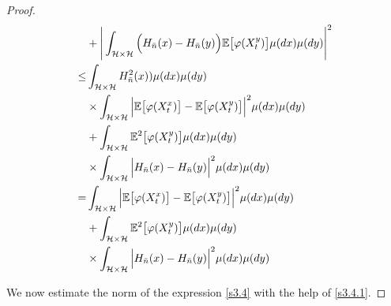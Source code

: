 \documentclass[review, onefignum, onetabnum]{siamart171218}
\begin{document}
\begin{proof}
\begin{equation}
\begin{aligned}
            &+
            \Bigg|
                \int_{\mathcal{H}
                \times
                \mathcal{H}
                }
                \Big(
                    H_{\bar n}(x) - H_{\bar n}(y)
                \Big)
                \mathbb{E}\big[
                    \varphi(X_t ^ y)
                \big]
                \mu(dx)\mu(dy)
            \Bigg|^2
            \\
            \le &
            \int_{\mathcal{H}\times \mathcal{H}}
                H_{\bar n}^2(x))
            \mu(dx)\mu(dy)
            \\
            &\times
                \int_{\mathcal{H}\times \mathcal{H}}
                \Big|
                    \mathbb{E}\big [
                        \varphi(X_t^x)
                    \big]
                    -
                    \mathbb{E}\big[
                        \varphi(X_t^y)
                    \big]
                \Big|^2
                \mu(dx)\mu(dy)
            \\
            &+
            \int_{\mathcal{H} \times \mathcal{H}}
                \mathbb{E}^2\big[
                    \varphi(X_t^y)
                \big]
            \mu(dx)\mu(dy)
            \\
             &\times
            \int_{\mathcal{H}\times \mathcal{H}}
            \Big|
                H_{\bar n}(x)-H_{\bar n}(y)
            \Big|^2
            \mu(dx)\mu(dy)
            \\
            =&
            \int_{\mathcal{H}\times \mathcal{H}}
                \Big|
                    \mathbb{E}\big [
                        \varphi(X_t^x)
                    \big]
                    -
                    \mathbb{E}\big[
                        \varphi(X_t^y)
                    \big]
                \Big|^2
                \mu(dx) \mu(dy)
            \\
            &+
            \int_{\mathcal{H}\times \mathcal{H}}
                \mathbb{E}^2\big[
                    \varphi(X_t^y)
                \big]
            \mu(dx)\mu(dy)
            \\
            & \times
            \int_{\mathcal{H}\times \mathcal{H}}
                \Big|
                    H_{\bar n}(x)
                    -
                    H_{\bar n}(y)
                \Big|^2
            \mu(dx)\mu(dy)
    \end{aligned}
\end{equation}

We now estimate the norm of the expression \eqref{s3.4} with the help of
\eqref{s3.4.1}.


\end{proof}
\end{document}
